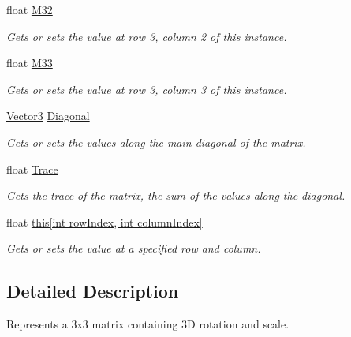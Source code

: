 \begin{DoxyCompactItemize}
float \hyperlink{struct_open_t_k_1_1_matrix3_af89a8226e4885fe65f1392969c923d20}{M32}
\begin{DoxyCompactList}\small\item\em Gets or sets the value at row 3, column 2 of this instance. \end{DoxyCompactList}\item 
float \hyperlink{struct_open_t_k_1_1_matrix3_a2862e6772d76da5809d71713cf375609}{M33}
\begin{DoxyCompactList}\small\item\em Gets or sets the value at row 3, column 3 of this instance. \end{DoxyCompactList}\item 
\hyperlink{struct_open_t_k_1_1_vector3}{Vector3} \hyperlink{struct_open_t_k_1_1_matrix3_a333e74e4d64af2234968fa14fdbbead9}{Diagonal}
\begin{DoxyCompactList}\small\item\em Gets or sets the values along the main diagonal of the matrix. \end{DoxyCompactList}\item 
float \hyperlink{struct_open_t_k_1_1_matrix3_a0c3de584ab6566c9347a322a98212e9a}{Trace}
\begin{DoxyCompactList}\small\item\em Gets the trace of the matrix, the sum of the values along the diagonal. \end{DoxyCompactList}\item 
float \hyperlink{struct_open_t_k_1_1_matrix3_a25f75c8c136a6e28863a29f3f16ad214}{this\mbox{[}int row\-Index, int column\-Index\mbox{]}}
\begin{DoxyCompactList}\small\item\em Gets or sets the value at a specified row and column. \end{DoxyCompactList}\end{DoxyCompactItemize}


\subsection{Detailed Description}
Represents a 3x3 matrix containing 3\-D rotation and scale. 




